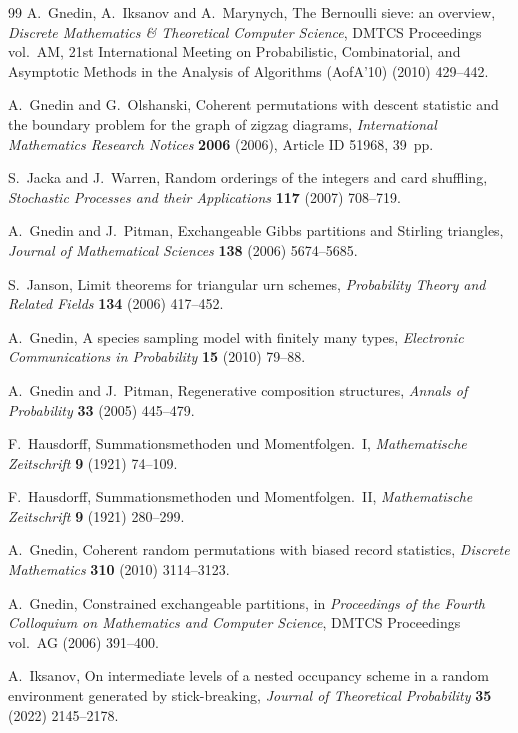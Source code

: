 \documentclass[11pt,reqno]{amsart}
\theoremstyle{definition}
\theoremstyle{remark}
\numberwithin{equation}{section}
\begin{document}
\begin{thebibliography}{99}
A.~Gnedin, A.~Iksanov and A.~Marynych,
The Bernoulli sieve: an overview,
\textit{Discrete Mathematics \& Theoretical Computer Science}, DMTCS Proceedings vol.~AM, 21st International Meeting on Probabilistic, Combinatorial, and Asymptotic Methods in the Analysis of Algorithms (AofA'10) (2010) 429--442.

A.~Gnedin and G.~Olshanski,
Coherent permutations with descent statistic and the boundary problem for the graph of zigzag diagrams,
\textit{International Mathematics Research Notices} \textbf{2006} (2006), Article ID 51968, 39~pp.

S.~Jacka and J.~Warren,
Random orderings of the integers and card shuffling,
\textit{Stochastic Processes and their Applications} \textbf{117} (2007) 708--719.

A.~Gnedin and J.~Pitman,
Exchangeable Gibbs partitions and Stirling triangles,
\textit{Journal of Mathematical Sciences} \textbf{138} (2006) 5674--5685.

S.~Janson,
Limit theorems for triangular urn schemes,
\textit{Probability Theory and Related Fields} \textbf{134} (2006) 417--452.

A.~Gnedin,
A species sampling model with finitely many types,
\textit{Electronic Communications in Probability} \textbf{15} (2010) 79--88.

A.~Gnedin and J.~Pitman,
Regenerative composition structures,
\textit{Annals of Probability} \textbf{33} (2005) 445--479.

F.~Hausdorff,
Summationsmethoden und Momentfolgen.~I,
\textit{Mathematische Zeitschrift} \textbf{9} (1921) 74--109.

F.~Hausdorff,
Summationsmethoden und Momentfolgen.~II,
\textit{Mathematische Zeitschrift} \textbf{9} (1921) 280--299.

A.~Gnedin,
Coherent random permutations with biased record statistics,
\textit{Discrete Mathematics} \textbf{310} (2010) 3114--3123.

A.~Gnedin,
Constrained exchangeable partitions,
in \textit{Proceedings of the Fourth Colloquium on Mathematics and Computer Science}, DMTCS Proceedings vol.~AG (2006) 391--400.

A.~Iksanov,
On intermediate levels of a nested occupancy scheme in a random environment generated by stick-breaking,
\textit{Journal of Theoretical Probability} \textbf{35} (2022) 2145--2178.


\end{thebibliography}
\end{document}
